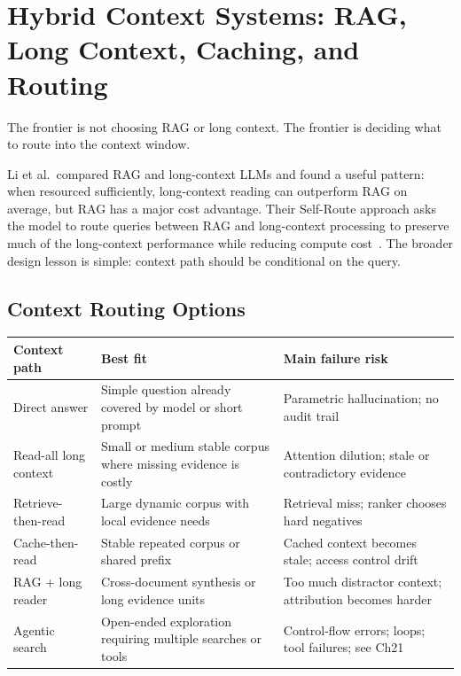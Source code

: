 \section{Hybrid Context Systems: RAG, Long Context, Caching, and Routing}
\label{sec:ch20-hybrid-routing}

The frontier is not choosing RAG or long context. The frontier is deciding what to route into the context window.

Li et al.\ compared RAG and long-context LLMs and found a useful pattern: when resourced sufficiently, long-context reading can outperform RAG on average, but RAG has a major cost advantage. Their Self-Route approach asks the model to route queries between RAG and long-context processing to preserve much of the long-context performance while reducing compute cost~\cite{li2024raglongcontext}. The broader design lesson is simple: context path should be conditional on the query.

\subsection{Context Routing Options}

\begin{center}
\begin{tabularx}{\textwidth}{@{}p{}p{}X@{}}
\toprule
\textbf{Context path} & \textbf{Best fit} & \textbf{Main failure risk} \\
\midrule
Direct answer & Simple question already covered by model or short prompt & Parametric hallucination; no audit trail \\
Read-all long context & Small or medium stable corpus where missing evidence is costly & Attention dilution; stale or contradictory evidence \\
Retrieve-then-read & Large dynamic corpus with local evidence needs & Retrieval miss; ranker chooses hard negatives \\
Cache-then-read & Stable repeated corpus or shared prefix & Cached context becomes stale; access control drift \\
RAG + long reader & Cross-document synthesis or long evidence units & Too much distractor context; attribution becomes harder \\
Agentic search & Open-ended exploration requiring multiple searches or tools & Control-flow errors; loops; tool failures; see Ch21 \\
\bottomrule
\end{tabularx}
\end{center}

